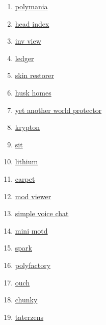 \begin{enumerate}
    \item \href{https://github.com/Patbox/polymania}{polymania}
    \item \href{https://github.com/PotatoPresident/HeadIndex}{head index}
    \item \href{https://github.com/PotatoPresident/InvView}{inv view}
    \item \href{https://github.com/QuiltServerTools/Ledger}{ledger}
    \item \href{https://github.com/Suiranoil/SkinRestorer}{skin restorer}
    \item \href{https://github.com/WiIIiam278/HuskHomes/}{husk homes}
    \item \href{https://github.com/Z0rdak/Yet-Another-World-Protector}{yet another world protector}
    \item \href{https://github.com/astei/krypton}{krypton}
    \item \href{https://github.com/bl4ckscor3/Sit}{sit}
    \item \href{https://github.com/caffeinemc/lithium-fabric}{lithium}
    \item \href{https://github.com/gnembon/fabric-carpet}{carpet}
    \item \href{https://github.com/haykam821/Mod-Viewer}{mod viewer}
    \item \href{https://github.com/henkelmax/simple-voice-chat}{simple voice chat}
    \item \href{https://github.com/jpenilla/MiniMOTD}{mini motd}
    \item \href{https://github.com/lucko/spark}{spark}
    \item \href{https://github.com/patbox/PolyFactory}{polyfactory}
    \item \href{https://github.com/patbox/ouch}{ouch}
    \item \href{https://github.com/pop4959/Chunky}{chunky}
    \item \href{https://github.com/samolego/Taterzens/}{taterzens}
\end{enumerate}


